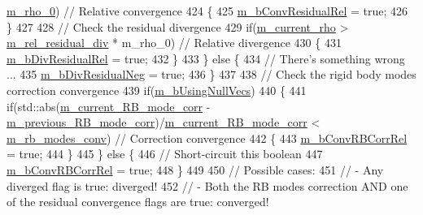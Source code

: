 \begin{DoxyCode}
      \hyperlink{classcarl_1_1_f_e_t_i___operations_a7d44cceb8c3e003f9e8c22972602fcc8}{m\_rho\_0}) \textcolor{comment}{// Relative convergence}
424         \{
425             \hyperlink{classcarl_1_1_f_e_t_i___operations_a167cb3dd2732a038aa33da11b51b2d3b}{m\_bConvResidualRel} = \textcolor{keyword}{true};
426         \}
427 
428         \textcolor{comment}{// Check the residual divergence}
429         \textcolor{keywordflow}{if}(\hyperlink{classcarl_1_1_f_e_t_i___operations_a1ecd729d4399772a6741c3b4bf69a69a}{m\_current\_rho} > \hyperlink{classcarl_1_1_f_e_t_i___operations_ae5050693b56d9bc3a3794014485fcf04}{m\_rel\_residual\_div} * m\_rho\_0) \textcolor{comment}{// Relative
       divergence}
430         \{
431             \hyperlink{classcarl_1_1_f_e_t_i___operations_a458f022e3ad766fadeab7746ef60f117}{m\_bDivResidualRel} = \textcolor{keyword}{true};
432         \}
433     \} \textcolor{keywordflow}{else} \{
434         \textcolor{comment}{// There's something wrong ...}
435         \hyperlink{classcarl_1_1_f_e_t_i___operations_a343191e25b52e6913b686039fb5bd318}{m\_bDivResidualNeg} = \textcolor{keyword}{true};
436     \} 
437 
438     \textcolor{comment}{// Check the rigid body modes correction convergence}
439     \textcolor{keywordflow}{if}(\hyperlink{classcarl_1_1_f_e_t_i___operations_aff68699ccceb6e1debc4ecab97dde2ff}{m\_bUsingNullVecs})
440     \{
441         \textcolor{keywordflow}{if}(std::abs(\hyperlink{classcarl_1_1_f_e_t_i___operations_a22ebb1138a1a8ca2b88d33c17a8fe299}{m\_current\_RB\_mode\_corr} - 
      \hyperlink{classcarl_1_1_f_e_t_i___operations_ae13cf11dfb8dd3a55742b06d96e0e941}{m\_previous\_RB\_mode\_corr})/\hyperlink{classcarl_1_1_f_e_t_i___operations_a22ebb1138a1a8ca2b88d33c17a8fe299}{m\_current\_RB\_mode\_corr} < 
      \hyperlink{classcarl_1_1_f_e_t_i___operations_a4e5cf9147182d2647b6379453a4ff10d}{m\_rb\_modes\_conv}) \textcolor{comment}{// Correction convergence}
442         \{
443             \hyperlink{classcarl_1_1_f_e_t_i___operations_a324e0a6913e912861b38449fb6c482b5}{m\_bConvRBCorrRel} = \textcolor{keyword}{true};
444         \}
445     \} \textcolor{keywordflow}{else} \{
446         \textcolor{comment}{// Short-circuit this boolean}
447         \hyperlink{classcarl_1_1_f_e_t_i___operations_a324e0a6913e912861b38449fb6c482b5}{m\_bConvRBCorrRel} = \textcolor{keyword}{true};
448     \}
449 
450     \textcolor{comment}{// Possible cases:}
451     \textcolor{comment}{// - Any diverged flag is true: diverged!}
452     \textcolor{comment}{// - Both the RB modes correction AND one of the residual convergence flags are true: converged!}

\end{DoxyCode}
